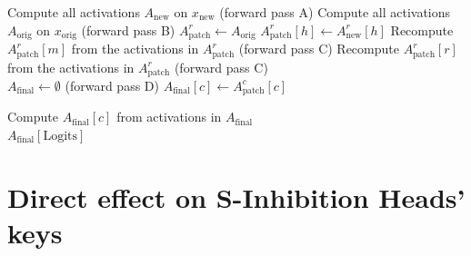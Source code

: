 \begin{algorithm}
\caption{Path patching}\label{path_patching}
\begin{algorithmic}[1]
\State Compute all activations $A_{\mathrm{new}}$ on $x_{\text{new}}$ (forward pass A)%
\State Compute all activations $A_{\mathrm{orig}}$ on $x_{\text{orig}}$ (forward pass B)
    \State $A^r_{\text{patch}} \gets A_{\mathrm{orig}}$
    \State $A^r_{\text{patch}}[h] \gets A^r_{\text{new}}[h]$
        \State Recompute $A^r_{\text{patch}}[m]$ from the activations in $A^r_{\text{patch}}$ (forward pass C) %
    \EndFor
    \State Recompute $A^r_{\text{patch}}[r]$ from the activations in $A^r_{\text{patch}}$ (forward pass C)
\EndFor\\

\State $A_{\text{final}} \gets \emptyset$
 (forward pass D)
        \State $A_{\text{final}}[c] \gets A^c_{\text{patch}}[c] $
    
    \Else
        \State Compute $A_{\text{final}}[c]$ from activations in $A_{\text{final}}$ 
    \EndIf
\EndFor \\

\Return $A_{\text{final}}[\text{Logits}]$ %
\end{algorithmic}
\end{algorithm}






\section{Direct effect on S-Inhibition Heads' keys} \label{app:s_in_keys}

